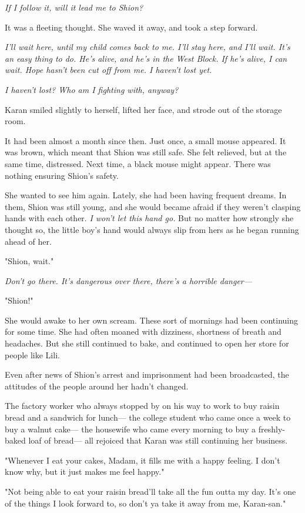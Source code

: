 \emph{If I follow it, will it lead me to Shion?}

It was a fleeting thought. She waved it away, and took a step forward.

\emph{I'll wait here, until my child comes back to me. I'll stay here, and
I'll wait. It's an easy thing to do. He's alive, and he's in the West
Block. If he's alive, I can wait. Hope hasn't been cut off from me. I
haven't lost yet.}

\emph{I haven't lost? Who am I fighting with, anyway?}

Karan smiled slightly to herself, lifted her face, and strode out of the
storage room.

It had been almost a month since then. Just once, a small mouse
appeared. It was brown, which meant that Shion was still safe. She felt
relieved, but at the same time, distressed. Next time, a black mouse
might appear. There was nothing ensuring Shion's safety.

She wanted to see him again. Lately, she had been having frequent
dreams. In them, Shion was still young, and she would became afraid if
they weren't clasping hands with each other. \emph{I won't let this hand go.}
But no matter how strongly she thought so, the little boy's hand would
always slip from hers as he began running ahead of her.

"Shion, wait."

\emph{Don't go there. It's dangerous over there, there's a horrible danger---}

"Shion!"

She would awake to her own scream. These sort of mornings had been
continuing for some time. She had often moaned with dizziness, shortness
of breath and headaches. But she still continued to bake, and continued
to open her store for people like Lili.

Even after news of Shion's arrest and imprisonment had been broadcasted,
the attitudes of the people around her hadn't changed.

The factory worker who always stopped by on his way to work to buy
raisin bread and a sandwich for lunch--- the college student who came once
a week to buy a walnut cake--- the housewife who came every morning to buy
a freshly-baked loaf of bread--- all rejoiced that Karan was still
continuing her business.

"Whenever I eat your cakes, Madam, it fills me with a happy feeling. I
don't know why, but it just makes me feel happy."

"Not being able to eat your raisin bread'll take all the fun outta my
day. It's one of the things I look forward to, so don't ya take it away
from me, Karan-san."

